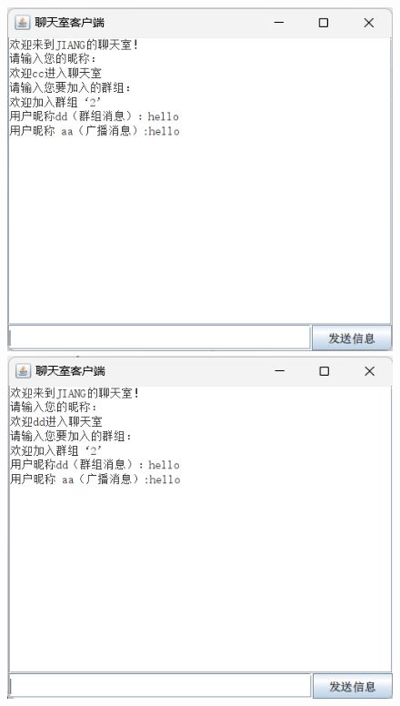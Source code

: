 \documentclass[UTF8,12pt]{article}
\begin{document}
\begin{figure}[htbp]
	\begin{minipage}{0.3\linewidth}
		\centering
		\includegraphics[width=0.9\linewidth]{img/14.png}
	\end{minipage}
	\begin{minipage}{0.3\linewidth}
		\centering
		\includegraphics[width=0.9\linewidth]{img/15.png}
	\end{minipage}
\end{figure}

\newpage
\end{document}
